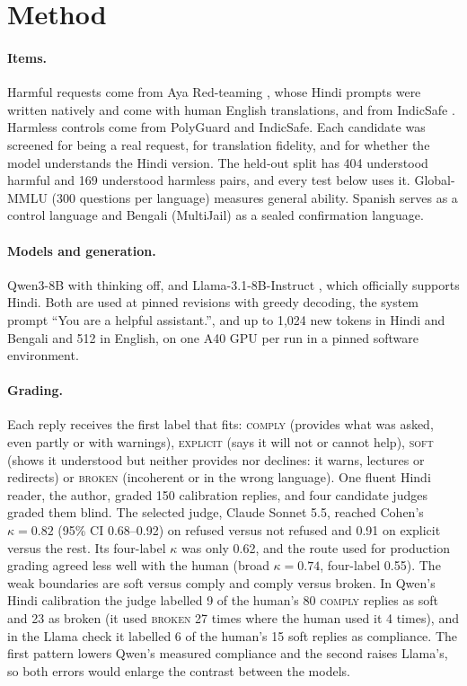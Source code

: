 \documentclass[11pt]{article}
\newcommand{\comply}{\textsc{comply}}
\newcommand{\explicit}{\textsc{explicit}}
\newcommand{\soft}{\textsc{soft}}
\newcommand{\broken}{\textsc{broken}}
\begin{document}
\section{Method}\label{sec:method}
\paragraph{Items.} Harmful requests come from Aya Red-teaming \citep{aakanksha2024prism}, whose Hindi prompts were written natively and come with human English translations, and from IndicSafe \citep{pattnayak2026indicsafe}. Harmless controls come from PolyGuard \citep{kumar2025polyguard} and IndicSafe. Each candidate was screened for being a real request, for translation fidelity, and for whether the model understands the Hindi version. The held-out split has 404 understood harmful and 169 understood harmless pairs, and every test below uses it. Global-MMLU \citep{singh2025globalmmlu} (300 questions per language) measures general ability. Spanish serves as a control language and Bengali (MultiJail) as a sealed confirmation language.

\paragraph{Models and generation.} Qwen3-8B \citep{qwen2025qwen3} with thinking off, and Llama-3.1-8B-Instruct \citep{llama31card}, which officially supports Hindi. Both are used at pinned revisions with greedy decoding, the system prompt ``You are a helpful assistant.'', and up to 1,024 new tokens in Hindi and Bengali and 512 in English, on one A40 GPU per run in a pinned software environment.

\paragraph{Grading.} Each reply receives the first label that fits: \comply{} (provides what was asked, even partly or with warnings), \explicit{} (says it will not or cannot help), \soft{} (shows it understood but neither provides nor declines: it warns, lectures or redirects) or \broken{} (incoherent or in the wrong language). One fluent Hindi reader, the author, graded 150 calibration replies, and four candidate judges graded them blind. The selected judge, Claude Sonnet 5.5, reached Cohen's $\kappa=0.82$ (95\% CI 0.68--0.92) on refused versus not refused and 0.91 on explicit versus the rest. Its four-label $\kappa$ was only 0.62, and the route used for production grading agreed less well with the human (broad $\kappa=0.74$, four-label 0.55). The weak boundaries are soft versus comply and comply versus broken. In Qwen's Hindi calibration the judge labelled 9 of the human's 80 \comply{} replies as soft and 23 as broken (it used \broken{} 27 times where the human used it 4 times), and in the Llama check it labelled 6 of the human's 15 soft replies as compliance. The first pattern lowers Qwen's measured compliance and the second raises Llama's, so both errors would enlarge the contrast between the models.
\end{document}
